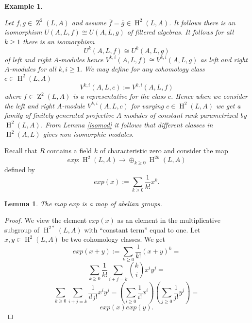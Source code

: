 \documentclass{amsart}
\theoremstyle{plain}
\newtheorem{lemma}[theorem]{Lemma}
\newtheorem{example}[theorem]{Example}
\theoremstyle{definition}
\theoremstyle{remark}
\numberwithin{equation}{theorem}
\begin{document}
\begin{example} \label{family} 

Let $f,g\in {\operatorname{Z}}^2(L,{A})$ and
assume $\overline{f}=\overline{g}\in {\operatorname{H} }^2(L,{A})$. It follows there is an isomorphism $U({A},L,f)\cong U({A},L,g)$ of filtered
algebras. It follows for all $k\geq 1$ there is an isomorphism
\[ U^k({A},L,f)\cong U^k({A},L,g) \]
of left and right ${A}$-modules hence $V^{k,i}({A},L,f)\cong V^{k,i}({A},L,g)$ as left and right ${A}$-modules for all
$k,i\geq 1$. We may define for any cohomology class $c\in {\operatorname{H} }^2(L,{A})$
\[ V^{k,i}({A},L,c):=V^{k,i}({A},L,f) \]
where $f\in {\operatorname{Z}}^2(L,{A})$ is a representative for the class $c$.
Hence when we consider the left and right ${A}$-module $V^{k,i}({A},L,c)$ for varying $c \in {\operatorname{H} }^2(L,{A})$ 
we get a family of finitely generated projective ${A}$-modules of constant rank 
parametrized by ${\operatorname{H} }^2(L,{A})$. 
From Lemma \ref{isomod} it follows that different classes in ${\operatorname{H} }^2({A},L)$ gives non-isomorphic modules.
\end{example}

Recall that  ${R}$ contains a field $k$ of characteristic zero and consider the map
\[ exp: {\operatorname{H} }^2(L,{A}) \rightarrow \oplus_{k\geq 0} {\operatorname{H} }^{2k}(L,{A}) \]
defined by
\[ exp(x):=\sum_{k\geq 0}\frac{1}{k!}x^k.\]

\begin{lemma} The map $exp$ is a map of abelian groups.
\end{lemma}
\begin{proof} We view the element $exp(x)$ as an element in the multiplicative subgroup of ${\operatorname{H} }^{2*}(L,{A})$
with ``constant term'' equal to one. 
Let $x,y\in {\operatorname{H} }^2(L,{A})$ be two cohomology classes.
We get
\[ exp(x+y):=\sum_{k\geq 0}\frac{1}{k!}(x+y)^k=\]
\[ \sum_{k\geq 0}\frac{1}{k!}\sum_{i+j=k}\binom{k}{i}x^iy^j=\]
\[\sum_{k\geq 0}\sum_{i+j=k}\frac{1}{i!j!}x^i y^j=(\sum_{i\geq 0}\frac{1}{i!}x^i)(\sum_{j\geq 0}\frac{1}{j!}y^j)=\]
\[exp(x)exp(y).\]
\end{proof}
\end{document}

